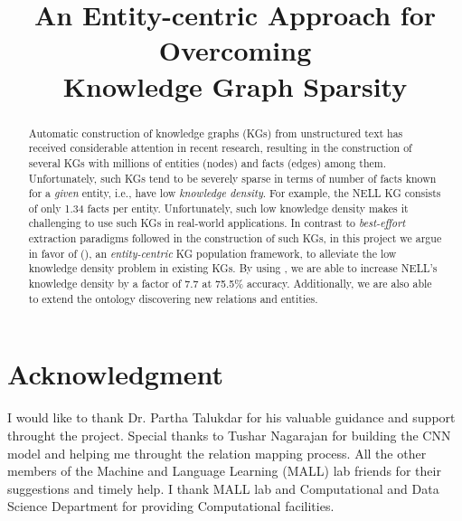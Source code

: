 \documentclass[conference]{IEEEtran}
\begin{document}
\title{An Entity-centric Approach for Overcoming \\Knowledge Graph Sparsity}
\author{
}
\maketitle

\begin{abstract}

Automatic construction of knowledge graphs (KGs) from unstructured text has received considerable attention in recent research, resulting in the construction of several KGs with 
millions of entities (nodes) and facts (edges) among them. Unfortunately, such KGs tend to be severely sparse in terms of number of facts known for a \emph{given} entity, i.e., have low 
\emph{knowledge density}. For example, the NELL KG consists of only 1.34 facts per entity. Unfortunately, such low knowledge density makes it challenging to use  such KGs in real-world 
applications. In contrast to \emph{best-effort} extraction paradigms followed in the construction of such KGs, in this project we argue in favor of \systemfull{} (\system{}), an \emph{entity-centric}
KG population framework, to alleviate the low knowledge density problem in existing KGs. By using \system{}, we are able to increase NELL's knowledge density 
by a factor of 7.7 at 75.5\% accuracy. Additionally, we are also able to extend the ontology discovering new relations and entities. 
\end{abstract}







\section*{Acknowledgment}
I would like to thank Dr. Partha Talukdar for his valuable guidance and support throught the project.
Special thanks to Tushar Nagarajan for building the CNN model and helping me throught the relation mapping process.
All the other members of the Machine and Language Learning (MALL) lab friends for their suggestions and timely help.
I thank MALL lab and Computational and Data Science Department for providing Computational facilities.



\end{document}
